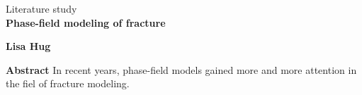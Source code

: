 \rmfamily

\thispagestyle{empty}           %


\newlength{\HeadBreite}
\setlength{\HeadBreite}{\textwidth}


\newlength{\BoxBreite}
\setlength{\BoxBreite}{\textwidth}     

               
\begin{center}
  {\large Literature study}\\
  {\bfseries {\LARGE Phase-field modeling of fracture \\[0.3cm]}}

\end{center}

\begin{center}
  {\large \textbf{Lisa Hug}\\}
\end{center}

\vspace{1cm}

{\bfseries Abstract} In recent years, phase-field models gained more and more attention in the fiel of fracture modeling. 


